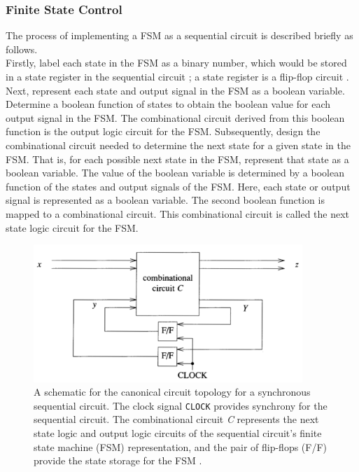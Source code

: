 \subsubsection{Finite State Control}
\label{sssec:FiniteStateControl}

The process of implementing a FSM as a sequential circuit is described briefly as follows. \\

Firstly, label each state in the FSM as a binary number, which would be stored in a state register in the sequential circuit \cite{Patterson2005a}; a state register is a flip-flop circuit \cite{Kang2003a,Rabaey2003,Weste2011}. Next, represent each state and output signal in the FSM as a boolean variable. Determine a boolean function of states to obtain the boolean value for each output signal in the FSM. The combinational circuit derived from this boolean function is the output logic circuit for the FSM. Subsequently, design the combinational circuit needed to determine the next state for a given state in the FSM. That is, for each possible next state in the FSM, represent that state as a boolean variable. The value of the boolean variable is determined by a boolean function of the states and output signals of the FSM. Here, each state or output signal is represented as a boolean variable. The second boolean function is mapped to a combinational circuit. This combinational circuit is called the next state logic circuit for the FSM. \\


\begin{figure}[h]
\centering 
\includegraphics[width=4in]{./pics/canonical-sequential-logic-circuit}
\caption{A schematic for the canonical circuit topology for a synchronous sequential circuit. The clock signal {\tt CLOCK} provides synchrony for the sequential circuit. The combinational circuit {\it C} represents the next state logic and output logic circuits of the sequential circuit's finite state machine (FSM) representation, and the pair of flip-flops (F/F) provide the state storage for the FSM \cite{Abramovici1990}.}
\label{fig:canonicalsequentiallogiccircuit}
\end{figure}

